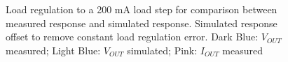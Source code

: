 \begin{figure}[ht]
	\centering
	
	\caption{Load regulation to a 200 mA load step for comparison between measured response and simulated response. Simulated response offset to remove constant load regulation error. Dark Blue: $V_{OUT}$ measured; Light Blue: $V_{OUT}$ simulated; Pink: $I_{OUT}$ measured}
	\label{fig:loadstep}
\end{figure}
\clearpage

